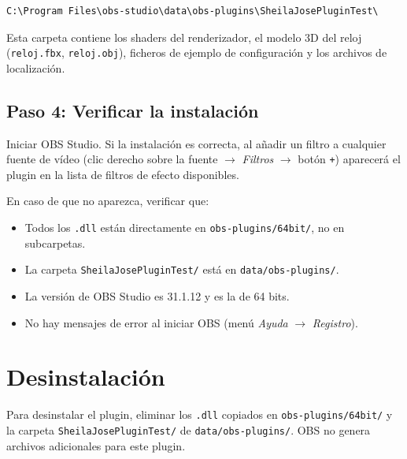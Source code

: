 \begin{verbatim}
C:\Program Files\obs-studio\data\obs-plugins\SheilaJosePluginTest\
\end{verbatim}

Esta carpeta contiene los shaders del renderizador, el modelo 3D del reloj (\texttt{reloj.fbx}, \texttt{reloj.obj}), ficheros de ejemplo de configuración y los archivos de localización.

\subsection*{Paso 4: Verificar la instalación}

Iniciar OBS Studio. Si la instalación es correcta, al añadir un filtro a cualquier fuente de vídeo (clic derecho sobre la fuente $\rightarrow$ \textit{Filtros} $\rightarrow$ botón \texttt{+}) aparecerá el plugin en la lista de filtros de efecto disponibles.

En caso de que no aparezca, verificar que:

\begin{itemize}
  \item Todos los \texttt{.dll} están directamente en \texttt{obs-plugins/64bit/}, no en subcarpetas.
  \item La carpeta \texttt{SheilaJosePluginTest/} está en \texttt{data/obs-plugins/}.
  \item La versión de OBS Studio es 31.1.12 y es la de 64 bits.
  \item No hay mensajes de error al iniciar OBS (menú \textit{Ayuda} $\rightarrow$ \textit{Registro}).
\end{itemize}

\section*{Desinstalación}

Para desinstalar el plugin, eliminar los \texttt{.dll} copiados en \texttt{obs-plugins/64bit/} y la carpeta \texttt{SheilaJosePluginTest/} de \texttt{data/obs-plugins/}. OBS no genera archivos adicionales para este plugin.
